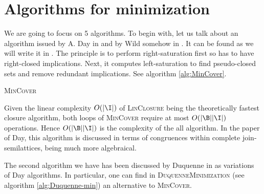 \documentclass[a4paper, 10pt]{article}
\begin{document}
	
\section{Algorithms for minimization}

We are going to focus on 5 algorithms. To begin with, let us talk about an algorithm issued by A. Day in \cite{day_lattice_1992} and by Wild somehow in
\cite{wild_implicational_1989}. It can be found as we will write it in \cite{ganter_conceptual_2016}. The principle is to perform right-saturation
first so has to have right-closed implications. Next, it computes left-saturation to find pseudo-closed sets and remove redundant implications.
See algorithm \ref{alg:MinCover}.

\begin{algorithm}
	
	\BlankLine
	\BlankLine
	
	
	\BlankLine
	
	
	\caption{\textsc{MinCover}}
	\label{alg:MinCover}	
\end{algorithm}

Given the linear complexity $O(|\I|)$ of \textsc{LinClosure} being the theoretically fastest closure algorithm, both loops of \textsc{MinCover}
require at most $O(|\B||\I|)$ operations. Hence $O(|\B||\I|)$ is the complexity of the all algorithm. In the paper of Day, this algorithm is discussed in terms
of congruences within complete join-semilattices, being much more algebraical.

The second algorithm we have has been discussed by Duquenne in \cite{duquenne_variations_2007} as variations of Day algorithms. In particular, one can find in \textsc{DuquenneMinimization} (see algorithm \ref{alg:Duquenne-min}) an alternative to \textsc{MinCover}.
\end{document}
